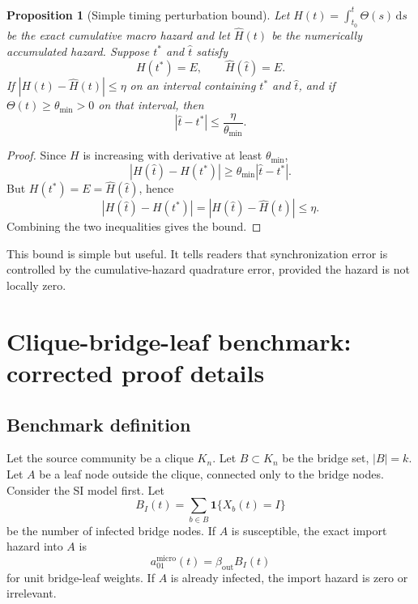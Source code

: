 \documentclass[12pt,a4paper]{article}
\newtheorem{proposition}{Proposition}
\theoremstyle{definition}
\newcommand{\1}{\mathbf{1}}
\newcommand{\dint}{\,\mathrm{d}}
\begin{document}
\begin{proposition}[Simple timing perturbation bound]
Let $H(t)=\int_{t_0}^t \Theta(s)\dint s$ be the exact cumulative macro hazard and let $\widehat H(t)$ be the numerically accumulated hazard.  Suppose $t^*$ and $\widehat t$ satisfy
\begin{equation}
    H(t^*)=E,\qquad \widehat H(\widehat t)=E.
\end{equation}
If $|H(t)-\widehat H(t)|\le \eta$ on an interval containing $t^*$ and $\widehat t$, and if $\Theta(t)\ge \theta_{\min}>0$ on that interval, then
\begin{equation}
    |\widehat t-t^*|\le \frac{\eta}{\theta_{\min}}.
\end{equation}
\end{proposition}

\begin{proof}
Since $H$ is increasing with derivative at least $\theta_{\min}$,
\begin{equation}
    |H(\widehat t)-H(t^*)|\ge \theta_{\min}|\widehat t-t^*|.
\end{equation}
But $H(t^*)=E=\widehat H(\widehat t)$, hence
\begin{equation}
    |H(\widehat t)-H(t^*)|=|H(\widehat t)-\widehat H(\widehat t)|\le \eta.
\end{equation}
Combining the two inequalities gives the bound.
\end{proof}

This bound is simple but useful.  It tells readers that synchronization error is controlled by the cumulative-hazard quadrature error, provided the hazard is not locally zero.

\section{Clique-bridge-leaf benchmark: corrected proof details}

\subsection{Benchmark definition}

Let the source community be a clique $K_n$.  Let $B\subset K_n$ be the bridge set, $|B|=k$.  Let $A$ be a leaf node outside the clique, connected only to the bridge nodes.  Consider the SI model first.  Let
\begin{equation}
    B_I(t)=\sum_{b\in B}\1\{X_b(t)=I\}
\end{equation}
be the number of infected bridge nodes.  If $A$ is susceptible, the exact import hazard into $A$ is
\begin{equation}
    a_{01}^{\mathrm{micro}}(t)=\beta_{\mathrm{out}}B_I(t)
\end{equation}
for unit bridge-leaf weights.  If $A$ is already infected, the import hazard is zero or irrelevant.
\end{document}
